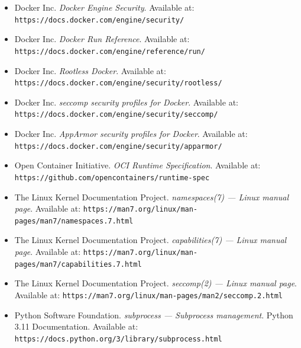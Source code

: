 \begin{itemize}

    \item Docker Inc.
    \textit{Docker Engine Security}.
    Available at: \texttt{https://docs.docker.com/engine/security/}

    \item Docker Inc.
    \textit{Docker Run Reference}.
    Available at: \texttt{https://docs.docker.com/engine/reference/run/}

    \item Docker Inc.
    \textit{Rootless Docker}.
    Available at:
    \texttt{https://docs.docker.com/engine/security/rootless/}

    \item Docker Inc.
    \textit{seccomp security profiles for Docker}.
    Available at:
    \texttt{https://docs.docker.com/engine/security/seccomp/}

    \item Docker Inc.
    \textit{AppArmor security profiles for Docker}.
    Available at:
    \texttt{https://docs.docker.com/engine/security/apparmor/}

    \item Open Container Initiative.
    \textit{OCI Runtime Specification}.
    Available at:
    \texttt{https://github.com/opencontainers/runtime-spec}

    \item The Linux Kernel Documentation Project.
    \textit{namespaces(7) --- Linux manual page}.
    Available at: \texttt{https://man7.org/linux/man-pages/man7/namespaces.7.html}

    \item The Linux Kernel Documentation Project.
    \textit{capabilities(7) --- Linux manual page}.
    Available at:
    \texttt{https://man7.org/linux/man-pages/man7/capabilities.7.html}

    \item The Linux Kernel Documentation Project.
    \textit{seccomp(2) --- Linux manual page}.
    Available at:
    \texttt{https://man7.org/linux/man-pages/man2/seccomp.2.html}

    \item Python Software Foundation.
    \textit{subprocess --- Subprocess management}.
    Python 3.11 Documentation.
    Available at: \texttt{https://docs.python.org/3/library/subprocess.html}

\end{itemize}

